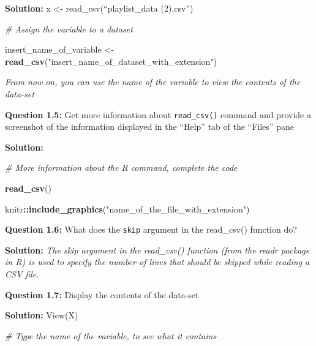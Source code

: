 \documentclass[
]{article}
\newenvironment{Shaded}{\begin{snugshade}}{\end{snugshade}}
\newcommand{\CommentTok}[1]{\textcolor[rgb]{0.56,0.35,0.01}{\textit{#1}}}
\newcommand{\FunctionTok}[1]{\textcolor[rgb]{0.13,0.29,0.53}{\textbf{#1}}}
\newcommand{\NormalTok}[1]{#1}
\newcommand{\OtherTok}[1]{\textcolor[rgb]{0.56,0.35,0.01}{#1}}
\newcommand{\SpecialCharTok}[1]{\textcolor[rgb]{0.81,0.36,0.00}{\textbf{#1}}}
\newcommand{\StringTok}[1]{\textcolor[rgb]{0.31,0.60,0.02}{#1}}
\begin{document}
\textbf{Solution:} x \textless- read\_csv(``playlist\_data (2).csv'')

\begin{Shaded}
\begin{Highlighting}[]
\CommentTok{\# Assign the variable to a dataset }

\NormalTok{insert\_name\_of\_variable }\OtherTok{\textless{}{-}} \FunctionTok{read\_csv}\NormalTok{(}\StringTok{"insert\_name\_of\_dataset\_with\_extension"}\NormalTok{) }
\end{Highlighting}
\end{Shaded}

\emph{From now on, you can use the name of the variable to view the
contents of the data-set}

\textbf{Question 1.5:} Get more information about \texttt{read\_csv()}
command and provide a screenshot of the information displayed in the
``Help'' tab of the ``Files'' pane

\textbf{Solution:}

\begin{Shaded}
\begin{Highlighting}[]
\CommentTok{\# More information about the R command, complete the code}

\FunctionTok{read\_csv}\NormalTok{()}
\end{Highlighting}
\end{Shaded}

\begin{Shaded}
\begin{Highlighting}[]
\NormalTok{knitr}\SpecialCharTok{::}\FunctionTok{include\_graphics}\NormalTok{(}\StringTok{"name\_of\_the\_file\_with\_extension"}\NormalTok{)}
\end{Highlighting}
\end{Shaded}

\textbf{Question 1.6:} What does the \texttt{skip} argument in the
read\_csv() function do?

\textbf{Solution:} \emph{The skip argument in the read\_csv() function
(from the readr package in R) is used to specify the number of lines
that should be skipped while reading a CSV file. }

\textbf{Question 1.7:} Display the contents of the data-set

\textbf{Solution:} View(X)

\begin{Shaded}
\begin{Highlighting}[]
\CommentTok{\# Type the name of the variable, to see what it contains}
\end{Highlighting}
\end{Shaded}
\end{document}
